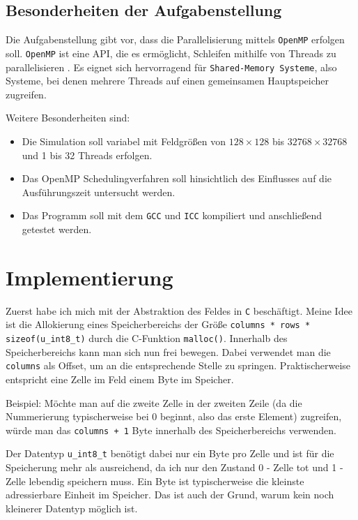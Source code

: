 \documentclass[german,plainarticle,hyperref,utf8]{zihpub}
\begin{document}
	\subsection{Besonderheiten der Aufgabenstellung}
	Die Aufgabenstellung gibt vor, dass die Parallelisierung mittels \texttt{OpenMP} erfolgen soll. \texttt{OpenMP} ist eine API, die es ermöglicht, Schleifen mithilfe von Threads zu parallelisieren \cite{openmp}. Es eignet sich hervorragend für \texttt{Shared-Memory Systeme}, also Systeme, bei denen mehrere Threads auf einen gemeinsamen Hauptspeicher zugreifen.
	
	Weitere Besonderheiten sind:
	\begin{itemize}
		\item Die Simulation soll variabel mit Feldgrößen von $128\times 128$ bis $32768\times 32768$ und 1 bis 32 Threads erfolgen.
		\item Das OpenMP Schedulingverfahren soll hinsichtlich des Einflusses auf die Ausführungszeit untersucht werden.
		\item Das Programm soll mit dem \texttt{GCC} und \texttt{ICC} kompiliert und anschließend getestet werden.
	\end{itemize}
	\newpage
	\section{Implementierung}
	Zuerst habe ich mich mit der Abstraktion des Feldes in \texttt{C} beschäftigt. Meine Idee ist die Allokierung eines Speicherbereichs der Größe \texttt{columns * rows * sizeof(u\_int8\_t)} durch die C-Funktion \texttt{malloc()}. Innerhalb des Speicherbereichs kann man sich nun frei bewegen. Dabei verwendet man die \texttt{columns} als Offset, um an die entsprechende Stelle zu springen. Praktischerweise entspricht eine Zelle im Feld einem Byte im Speicher.
	
	Beispiel: Möchte man auf die zweite Zelle in der zweiten Zeile (da die Nummerierung typischerweise bei 0 beginnt, also das erste Element) zugreifen, würde man das \texttt{columns + 1} Byte innerhalb des Speicherbereichs verwenden.
	
	Der Datentyp \texttt{u\_int8\_t} benötigt dabei nur ein Byte pro Zelle und ist für die Speicherung mehr als ausreichend, da ich nur den Zustand 0 - Zelle tot und 1 - Zelle lebendig speichern muss. Ein Byte ist typischerweise die kleinste adressierbare Einheit im Speicher. Das ist auch der Grund, warum kein noch kleinerer Datentyp möglich ist.\\
	
\end{document}
